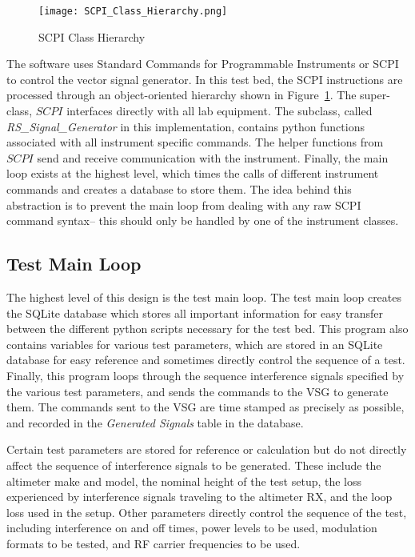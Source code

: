 \begin{figure}[ht]
\centering
\texttt{[image: SCPI\_Class\_Hierarchy.png]}
\caption[]{SCPI Class Hierarchy}

\label{fig:SCPI}

\end{figure}
The software uses Standard Commands for Programmable Instruments or SCPI to control the vector signal generator. In this test bed, the SCPI instructions are processed through an object-oriented hierarchy shown in Figure~\ref{fig:SCPI}. The super-class, $SCPI$ interfaces directly with all lab equipment. The subclass, called \textit{RS\_Signal\_Generator} in this implementation, contains python functions associated with all instrument specific commands. The helper functions from $SCPI$ send and receive communication with the instrument. Finally, the main loop exists at the highest level, which times the calls of different instrument commands and creates a database to store them. The idea behind this abstraction is to prevent the main loop from dealing with any raw SCPI command syntax-- this should only be handled by one of the instrument classes. 



\subsection{Test Main Loop}\label{sub:mainloop}
The highest level of this design is the test main loop. The test main loop creates the SQLite database which stores all important information for easy transfer between the different python scripts necessary for the test bed. This program also contains variables for various test parameters, which are stored in an SQLite database for easy reference and sometimes directly control the sequence of a test. Finally, this program loops through the sequence interference signals specified by the various test parameters, and sends the commands to the VSG to generate them. The commands sent to the VSG are time stamped as precisely as possible, and recorded in the \textit{Generated Signals} table in the database. 


Certain test parameters are stored for reference or calculation but do not directly affect the sequence of interference signals to be generated. These include the altimeter make and model, the nominal height of the test setup, the loss experienced by interference signals traveling to the altimeter RX, and the loop loss used in the setup. Other parameters directly control the sequence of the test, including interference on and off times, power levels to be used, modulation formats to be tested, and RF carrier frequencies to be used. 

